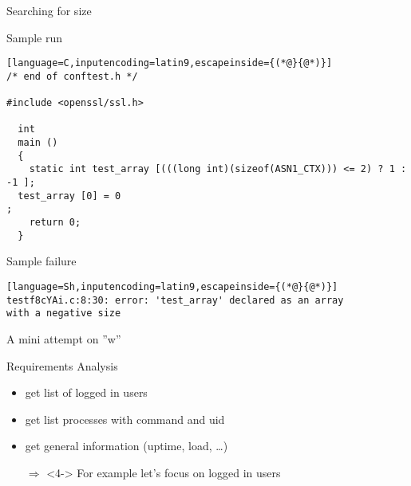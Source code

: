 \documentclass[ngerman,xcolor={table,dvipsnames},smaller,compress,hyperref={bookmarks,colorlinks}]{beamer}%
\begin{document}
\begin{frame}[fragile]{Searching for size}
\begin{block}{Sample run}
\scriptsize
\begin{lstlisting}[language=C,inputencoding=latin9,escapeinside={(*@}{@*)}]
/* end of conftest.h */

#include <openssl/ssl.h>

  int
  main ()
  {
    static int test_array [(((long int)(sizeof(ASN1_CTX))) <= 2) ? 1 : -1 ];
  test_array [0] = 0
;
    return 0;
  }
\end{lstlisting} %
\end{block}

\begin{block}{Sample failure}
\scriptsize
\begin{lstlisting}[language=Sh,inputencoding=latin9,escapeinside={(*@}{@*)}]
testf8cYAi.c:8:30: error: 'test_array' declared as an array
with a negative size
\end{lstlisting} %
\end{block}
\end{frame}

\begin{frame}[fragile]{A mini attempt on ''w''}
\begin{block}{Requirements Analysis}
\begin{itemize}
\item get list of logged in users
\item<2-> get list processes with command and uid
\item<3-> get general information (uptime, load, \ldots)
\end{itemize}
\begin{itemize}
\item[$\Rightarrow$]<4-> For example let's focus on logged in users
\end{itemize}
\end{block}
\end{frame}
\end{document}
